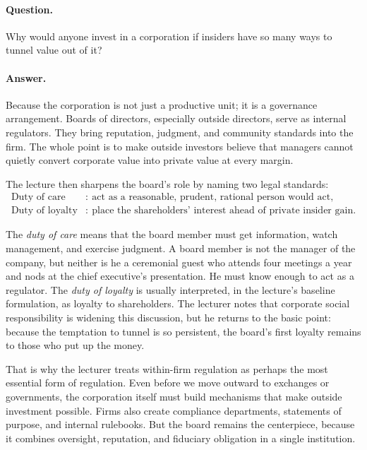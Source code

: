 \paragraph{Question.} Why would anyone invest in a corporation if insiders have so many ways to tunnel value out of it?

\paragraph{Answer.} Because the corporation is not just a productive unit; it is a governance arrangement. Boards of directors, especially outside directors, serve as internal regulators. They bring reputation, judgment, and community standards into the firm. The whole point is to make outside investors believe that managers cannot quietly convert corporate value into private value at every margin.

The lecture then sharpens the board's role by naming two legal standards:
\begin{align}
\text{Duty of care}
&:\ \text{act as a reasonable, prudent, rational person would act},\\
\text{Duty of loyalty}
&:\ \text{place the shareholders' interest ahead of private insider gain}.
\end{align}

The \emph{duty of care} means that the board member must get information, watch management, and exercise judgment. A board member is not the manager of the company, but neither is he a ceremonial guest who attends four meetings a year and nods at the chief executive's presentation. He must know enough to act as a regulator. The \emph{duty of loyalty} is usually interpreted, in the lecture's baseline formulation, as loyalty to shareholders. The lecturer notes that corporate social responsibility is widening this discussion, but he returns to the basic point: because the temptation to tunnel is so persistent, the board's first loyalty remains to those who put up the money.

That is why the lecturer treats within-firm regulation as perhaps the most essential form of regulation. Even before we move outward to exchanges or governments, the corporation itself must build mechanisms that make outside investment possible. Firms also create compliance departments, statements of purpose, and internal rulebooks. But the board remains the centerpiece, because it combines oversight, reputation, and fiduciary obligation in a single institution.

